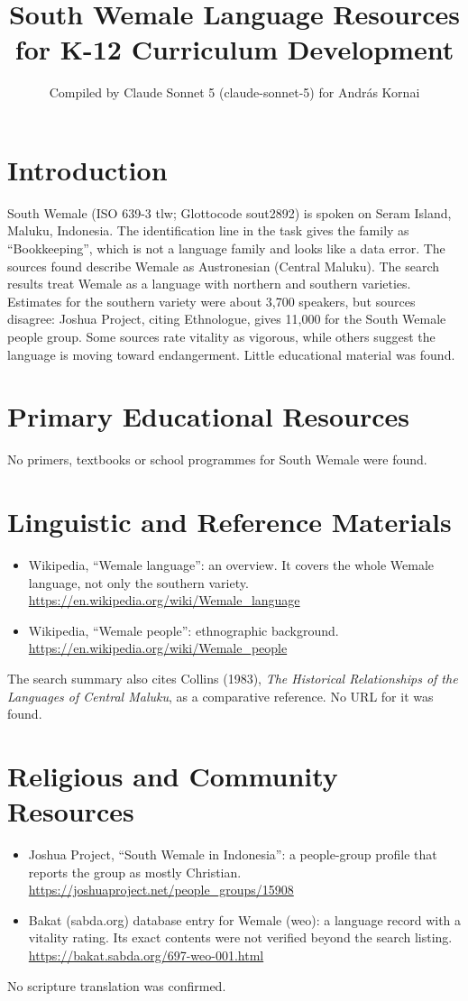 \documentclass[12pt]{article}
\title{South Wemale Language Resources for K-12 Curriculum Development}
\author{Compiled by Claude Sonnet 5 (claude-sonnet-5) for Andr\'as Kornai}
\date{}
\begin{document}
\maketitle

\section{Introduction}
South Wemale (ISO 639-3 tlw; Glottocode sout2892) is spoken on Seram Island, Maluku, Indonesia. The identification line in the task gives the family as ``Bookkeeping'', which is not a language family and looks like a data error. The sources found describe Wemale as Austronesian (Central Maluku). The search results treat Wemale as a language with northern and southern varieties. Estimates for the southern variety were about 3,700 speakers, but sources disagree: Joshua Project, citing Ethnologue, gives 11,000 for the South Wemale people group. Some sources rate vitality as vigorous, while others suggest the language is moving toward endangerment. Little educational material was found.

\section{Primary Educational Resources}
No primers, textbooks or school programmes for South Wemale were found.

\section{Linguistic and Reference Materials}
\begin{itemize}
\item Wikipedia, ``Wemale language'': an overview. It covers the whole Wemale language, not only the southern variety. \url{https://en.wikipedia.org/wiki/Wemale_language}
\item Wikipedia, ``Wemale people'': ethnographic background. \url{https://en.wikipedia.org/wiki/Wemale_people}
\end{itemize}
The search summary also cites Collins (1983), \emph{The Historical Relationships of the Languages of Central Maluku}, as a comparative reference. No URL for it was found.

\section{Religious and Community Resources}
\begin{itemize}
\item Joshua Project, ``South Wemale in Indonesia'': a people-group profile that reports the group as mostly Christian. \url{https://joshuaproject.net/people_groups/15908}
\item Bakat (sabda.org) database entry for Wemale (weo): a language record with a vitality rating. Its exact contents were not verified beyond the search listing. \url{https://bakat.sabda.org/697-weo-001.html}
\end{itemize}
No scripture translation was confirmed.
\end{document}
